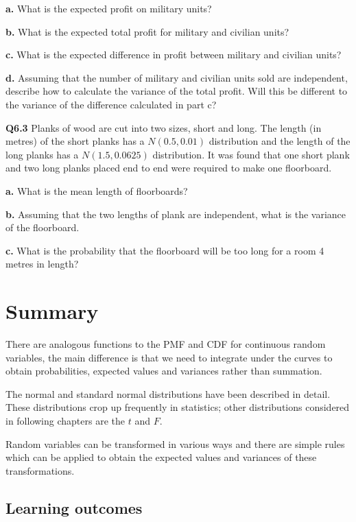 \documentclass[
  oneside]{krantz}
\begin{document}
\textbf{a.} What is the expected profit on military units?

\textbf{b.} What is the expected total profit for military and civilian units?

\textbf{c.} What is the expected difference in profit between military and civilian units?

\textbf{d.} Assuming that the number of military and civilian units sold are independent, describe how to calculate the variance of the total profit. Will this be different to the variance of the difference calculated in part c?

\textbf{Q6.3} Planks of wood are cut into two sizes, short and long. The length (in metres) of the short planks has a \(N(0.5, 0.01)\) distribution and the length of the long planks has a \(N(1.5, 0.0625)\) distribution. It was found that one short plank and two long planks placed end to end were required to make one floorboard.

\textbf{a.} What is the mean length of floorboards?

\textbf{b.} Assuming that the two lengths of plank are independent, what is the variance of the floorboard.

\textbf{c.} What is the probability that the floorboard will be too long for a room 4 metres in length?

\hypertarget{SUMcontrv}{%
\section{Summary}\label{SUMcontrv}}

There are analogous functions to the PMF and CDF for continuous random variables, the main difference is that we need to integrate under the curves to obtain probabilities, expected values and variances rather than summation.

The normal and standard normal distributions have been described in detail. These distributions crop up frequently in statistics; other distributions considered in following chapters are the \(t\) and \(F\).

Random variables can be transformed in various ways and there are simple rules which can be applied to obtain the expected values and variances of these transformations.

\hypertarget{learning-outcomes-3}{%
\subsection{Learning outcomes}\label{learning-outcomes-3}}
\end{document}
